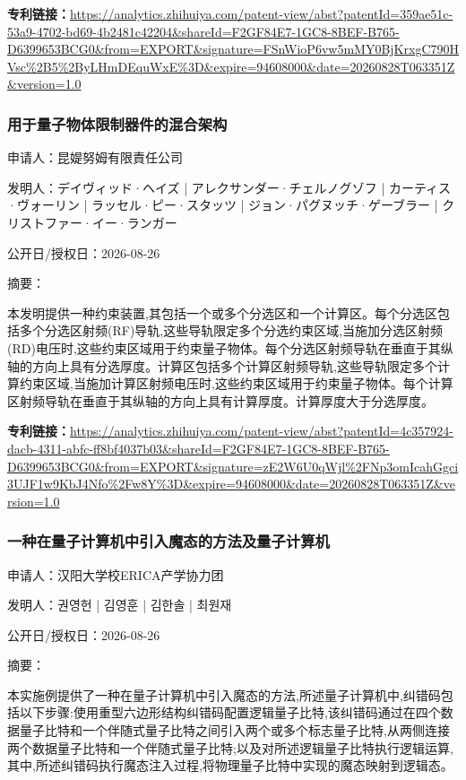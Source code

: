 \documentclass[12pt,a4paper]{ctexart}
\begin{document}
\noindent\textbf{专利链接：}\url{https://analytics.zhihuiya.com/patent-view/abst?patentId=359ae51c-53a9-4702-bd69-4b2481c42204&shareId=F2GF84E7-1GC8-8BEF-B765-D6399653BCG0&from=EXPORT&signature=FSnWioP6vw5mMY0BjKrxgC790HVsc%2B5%2ByLHmDEquWxE%3D&expire=94608000&date=20260828T063351Z&version=1.0}

\subsubsection{ 用于量子物体限制器件的混合架构 }

申请人：昆媞努姆有限責任公司

发明人：デイヴィッド·ヘイズ | アレクサンダー·チェルノグゾフ | カーティス·ヴォーリン | ラッセル·ピー·スタッツ | ジョン·パグヌッチ·ゲーブラー | クリストファー·イー·ランガー

公开日/授权日：2026-08-26

摘要：

本发明提供一种约束装置,其包括一个或多个分选区和一个计算区。每个分选区包括多个分选区射频(RF)导轨,这些导轨限定多个分选约束区域,当施加分选区射频(RD)电压时,这些约束区域用于约束量子物体。每个分选区射频导轨在垂直于其纵轴的方向上具有分选厚度。计算区包括多个计算区射频导轨,这些导轨限定多个计算约束区域,当施加计算区射频电压时,这些约束区域用于约束量子物体。每个计算区射频导轨在垂直于其纵轴的方向上具有计算厚度。计算厚度大于分选厚度。

\noindent\textbf{专利链接：}\url{https://analytics.zhihuiya.com/patent-view/abst?patentId=4c357924-dacb-4311-abfc-ff8bf4037b03&shareId=F2GF84E7-1GC8-8BEF-B765-D6399653BCG0&from=EXPORT&signature=zE2W6U0qWjl%2FNp3omIcahGgci3UJF1w9KbJ4Nfo%2Fw8Y%3D&expire=94608000&date=20260828T063351Z&version=1.0}

\subsubsection{ 一种在量子计算机中引入魔态的方法及量子计算机 }

申请人：汉阳大学校ERICA产学协力团

发明人：권영헌 | 김영훈 | 김한솔 | 최원재

公开日/授权日：2026-08-26

摘要：

本实施例提供了一种在量子计算机中引入魔态的方法,所述量子计算机中,纠错码包括以下步骤:使用重型六边形结构纠错码配置逻辑量子比特,该纠错码通过在四个数据量子比特和一个伴随式量子比特之间引入两个或多个标志量子比特,从两侧连接两个数据量子比特和一个伴随式量子比特;以及对所述逻辑量子比特执行逻辑运算,其中,所述纠错码执行魔态注入过程,将物理量子比特中实现的魔态映射到逻辑态。
\end{document}
